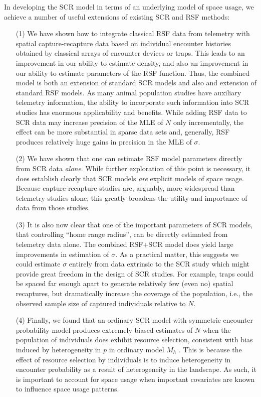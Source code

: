 \documentclass[12pt]{article}
\begin{document}
In developing the SCR model in terms of an underlying model of space
usage, we achieve a number of useful extensions of existing
SCR and RSF methods:
\begin{itemize}
\item[(1)] We have shown how to integrate classical RSF data from
telemetry with spatial capture-recapture data based on individual
encounter histories obtained by classical arrays of encounter devices
or traps. This leads to an improvement in our ability to estimate
density, and also an improvement in our ability to estimate parameters
of the RSF function.  Thus, the combined model is both an extension of
standard SCR models and also and extension of standard RSF models. As
many animal population studies have auxiliary telemetry information,
the ability to incorporate such information into SCR studies has
enormous applicability and
benefits.
While adding RSF data to SCR data may increase precision of the MLE of $N$
only incrementally, the effect can be more substantial in sparse data sets
and, generally, RSF produces
relatively huge gains in precision in the MLE of $\sigma$.
\item[(2)] We have shown that one can estimate RSF model parameters
directly from SCR data {\it alone}.
While further exploration of this point
is necessary,
it does establish clearly that SCR
models {\it are} explicit models of space usage. Because
capture-recapture studies are, arguably, more widespread than
telemetry studies alone, this greatly broadens the utility and
importance of data from those studies.
\item[(3)] It is also now clear
that one of the important parameters of SCR models, that controlling
``home range radius'', can be directly estimated from telemetry data
alone.
The combined RSF+SCR model does yield large improvements in estimation
of $\sigma$. As a practical matter, this suggests we could estimate
$\sigma$ entirely from data extrinsic to the SCR study which might
provide great freedom in the design of SCR studies. For example, traps
could be spaced far enough apart to generate relatively few (even no) spatial recaptures,
but dramatically increase the coverage of the population, i.e., the
observed sample size of captured individuals relative to $N$.
\item[(4)] Finally, we found that an
ordinary SCR model with symmetric encounter probability model produces
extremely biased estimates of $N$ when the population of individuals
does exhibit resource selection, consistent with bias induced by
heterogeneity in $p$ in ordinary model $M_{h}$
\citep{dorazio_royle:2003}. This is because the effect of resource
selection by individuals is to induce heterogeneity in encounter
probability as a result of heterogeneity in the landscape.
  As such, it is important to account
for space usage when important covariates are known to influence
space usage patterns.
\end{itemize}
\end{document}
